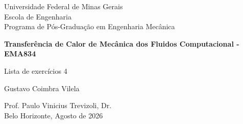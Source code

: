 \begin{titlepage}
\begin{center}
{\large Universidade Federal de Minas Gerais\\
Escola de Engenharia \\
Programa de Pós-Graduação em Engenharia Mecânica\\}

\vspace{6cm}
{\bf\Large Transferência de Calor de Mecânica dos Fluidos Computacional - EMA834\vspace{1.0cm}

Lista de exercícios 4}
\vspace{4cm}

{\large Gustavo Coimbra Vilela}
\vspace{2cm}  
   
\vspace{2cm}          
{\large Prof. Paulo Vinicius Trevizoli, Dr.}\\


\vfill
{\large Belo Horizonte, Agosto de 2026 }
\end{center}

\end{titlepage}